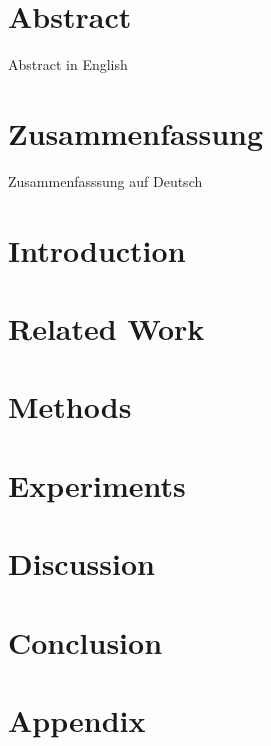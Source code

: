 \clearpage


\pagestyle{useheadings} %

\chapter*{Abstract}\label{c.abstract}
Abstract in English

\clearpage
\chapter*{Zusammenfassung}\label{c.zusammenfassung}
\foreignlanguage{ngerman}{
Zusammenfasssung auf Deutsch
}

\clearpage
\tableofcontents
\clearpage
\listoffigures
\clearpage
\listoftables

\clearpage
{} %
\chapter{Introduction}\label{c.introduction}


\clearpage
\chapter{Related Work}\label{c.related}


\clearpage
\chapter{Methods}\label{c.methods}


\clearpage
\chapter{Experiments}\label{c.experiments}


\clearpage
\chapter{Discussion}\label{c.discussion}


\clearpage 
\chapter{Conclusion}\label{c.conclusion}


\clearpage
\appendix
\chapter{Appendix}


\clearpage
%



